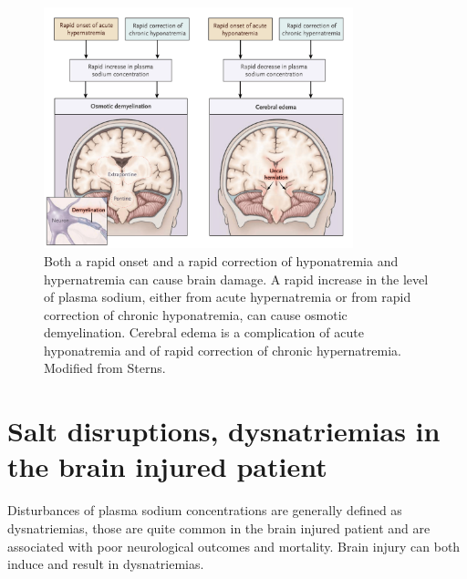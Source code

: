 \begin{figure}[h]
    \centering
    \includegraphics[width=0.8\textwidth]{pictures/fig1.png}
    \caption{Both a rapid onset and a rapid correction of hyponatremia and hypernatremia can cause brain damage. A rapid increase in the level of plasma sodium, either from acute hypernatremia or from rapid correction of chronic hyponatremia, can cause osmotic demyelination. Cerebral edema is a complication of acute hyponatremia and of rapid correction of chronic hypernatremia. Modified from Sterns\cite{sternsDisordersPlasmaSodium2015a}.}
\end{figure}

\section{Salt disruptions, dysnatriemias in the brain injured patient}
Disturbances of plasma sodium concentrations are generally defined as dysnatriemias, those are quite common in the brain injured patient and are associated with poor neurological outcomes and mortality. Brain injury can both induce and result in dysnatriemias.\\

